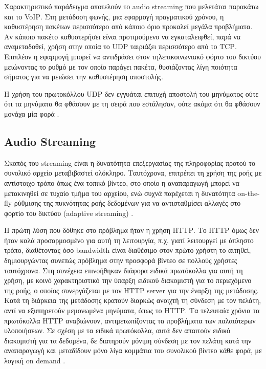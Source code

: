 \documentclass[a4paper,10pt]{article}
\begin{document}
Χαρακτηριστικό παράδειγμα αποτελούν το \foreignlanguage{english}{audio streaming} που μελετάται παρακάτω και το \foreignlanguage{english}{VoIP}. Στη μετάδοση φωνής, μια εφαρμογή πραγματικού χρόνου, η καθυστέρηση πακέτων περισσότερο από κάποιο όριο προκαλεί μεγάλα προβλήματα. Αν κάποιο πακέτο καθυστερήσει είναι προτιμούμενο να εγκαταλειφθεί, παρά να αναμεταδοθεί, χρήση στην οποία το \foreignlanguage{english}{UDP} ταιριάζει περισσότερο από το \foreignlanguage{english}{TCP}. Επιπλέον η εφαρμογή μπορεί να αντιδράσει στον τηλεπικοινωνιακό φόρτο του δικτύου μειώνοντας το ρυθμό με τον οποίο παράγει πακέτα, θυσιάζοντας λίγη ποιότητα σήματος για να μειώσει την καθυστέρηση αποστολής.

Η χρήση του πρωτοκόλλου \foreignlanguage{english}{UDP} δεν εγγυάται επιτυχή αποστολή του μηνύματος ούτε ότι τα μηνύματα θα φθάσουν με τη σειρά που εστάλησαν, ούτε ακόμα ότι θα φθάσουν μονάχα μία φορά \cite{udp-wikibooks}.

\subsection{\foreignlanguage{english}{Audio Streaming}}
Σκοπός του \foreignlanguage{english}{streaming} είναι η δυνατότητα επεξεργασίας της πληροφορίας προτού το συνολικό αρχείο μεταβιβαστεί ολόκληρο. Ταυτόχρονα, επιτρέπει τη χρήση της ροής με αντίστοιχο τρόπο όπως ένα τοπικό βίντεο, στο οποίο η αναπαραγωγή μπορεί να μετακινηθεί σε τυχαίο τμήμα του αρχείου, ενώ συχνά παρέχεται η δυνατότητα \foreignlanguage{english}{on-the-fly} ρύθμισης της πυκνότητας ροής δεδομένων για να αντισταθμίσει αλλαγές στο φορτίο του δικτύου (\foreignlanguage{english}{adaptive streaming}) \cite{streamingprotocols}.

Η πρώτη λύση που δόθηκε στο πρόβλημα ήταν η χρήση \foreignlanguage{english}{HTTP}. Το \foreignlanguage{english}{HTTP} όμως δεν ήταν καλά προσαρμοσμένο για αυτή τη λειτουργία, π.χ. γιατί λειτουργεί με άπληστο τρόπο, διαθέτοντας όσο \foreignlanguage{english}{bandwidth} είναι διαθέσιμο στον πρώτο χρήστη το αιτηθεί, δημιουργώντας συνεπώς πρόβλημα στην προσφορά βίντεο σε πολλούς χρήστες ταυτόχρονα. Στη συνέχεια επινοήθηκαν διάφορα ειδικά πρωτόκολλα για αυτή τη χρήση, με κοινό χαρακτηριστικό την ύπαρξη ειδικού διακομιστή για το περιεχόμενο της ροής, ο οποίος συνεργάζεται με τον \foreignlanguage{english}{HTTP server} για την έναρξη της μετάδοσης. Κατά τη διάρκεια της μετάδοσης κρατούν διαρκώς ανοιχτή τη σύνδεση με τον πελάτη, αντί να εξυπηρετούν μεμονωμένα μηνύματα, όπως το \foreignlanguage{english}{HTTP}.
Τα τελευταία χρόνια τα πρωτόκολλα \foreignlanguage{english}{HTTP} αναβιώνουν, αντιμετωπίζοντας τα προβλήματα των παλαιότερων υλοποιήσεων. Σε σχέση με τα ειδικά πρωτόκολλα, αυτά δεν απαιτούν ειδικό διακομιστή για τα δεδομένα, δε διατηρούν μόνιμη σύνδεση με τον πελάτη κατά την αναπαραγωγή και μεταδίδουν μόνο λίγα κομμάτια του συνολικού βίντεο κάθε φορά, με λογική \foreignlanguage{english}{on demand} \cite{streamingmedia}.
\end{document}
